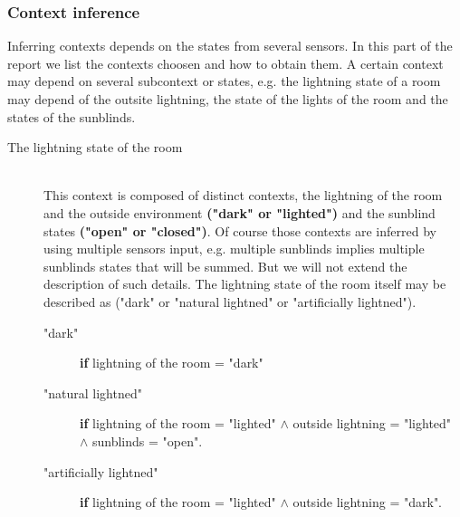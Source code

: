 \documentclass{acm_proc_article-sp}
\begin{document}
\subsubsection{Context inference}
Inferring contexts depends on the states from several sensors. In this part of the report we list the contexts choosen and how to obtain them.
A certain context may depend on several subcontext or states, 
e.g. the lightning state of a room may depend of the outsite lightning, the state of the lights of the room and the states of the sunblinds.
\begin{description}
 \item[The lightning state of the room]\hfill \\ 
 This context is composed of distinct contexts, the lightning of the room and the outside environment \textbf{("dark" or "lighted")} and the sunblind states \textbf{("open" or "closed")}. 
 Of course those contexts are inferred by using multiple sensors input, e.g. multiple sunblinds implies multiple sunblinds states that will be summed. But we will not extend the description of such details.
 The lightning state of the room itself may be described as ("dark" or "natural lightned" or "artificially lightned").
 \begin{description}
  \item["dark"] \textbf{if} lightning of the room = "dark"
  \item["natural lightned"] \textbf{if} lightning of the room = "lighted" $\land$ outside lightning = "lighted" $\land$ sunblinds = "open".
  \item["artificially lightned"] \textbf{if} lightning of the room = "lighted" $\land$ outside lightning = "dark".
 \end{description}
 

\end{description}
\end{document}
